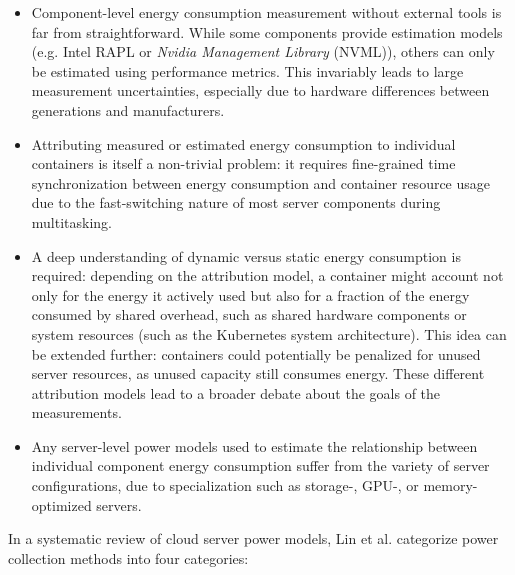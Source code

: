 \begin{itemize}
    \item Component-level energy consumption measurement without external tools is far from straightforward. While some components provide estimation models (e.g. Intel RAPL or \textit{Nvidia Management Library} (NVML)), others can only be estimated using performance metrics. This invariably leads to large measurement uncertainties, especially due to hardware differences between generations and manufacturers.
    \item Attributing measured or estimated energy consumption to individual containers is itself a non-trivial problem: it requires fine-grained time synchronization between energy consumption and container resource usage due to the fast-switching nature of most server components during multitasking.
    \item A deep understanding of dynamic versus static energy consumption is required: depending on the attribution model, a container might account not only for the energy it actively used but also for a fraction of the energy consumed by shared overhead, such as shared hardware components or system resources (such as the Kubernetes system architecture). This idea can be extended further: containers could potentially be penalized for unused server resources, as unused capacity still consumes energy. These different attribution models lead to a broader debate about the goals of the measurements.
    \item Any server-level power models used to estimate the relationship between individual component energy consumption suffer from the variety of server configurations, due to specialization such as storage-, GPU-, or memory-optimized servers.
\end{itemize}

In a systematic review of cloud server power models, Lin et al.\parencite{lin2020taxonomy} categorize power collection methods into four categories:

